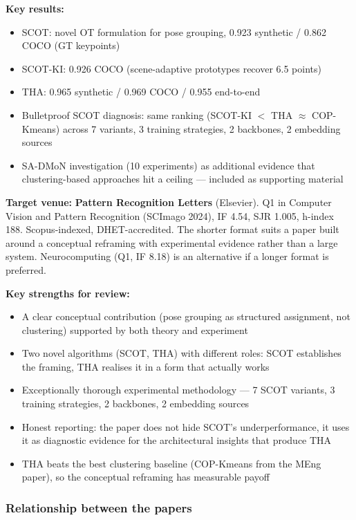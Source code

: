 \textbf{Key results:}
\begin{itemize}
    \item SCOT: novel OT formulation for pose grouping, 0.923 synthetic / 0.862 COCO (GT keypoints)
    \item SCOT-KI: 0.926 COCO (scene-adaptive prototypes recover 6.5 points)
    \item THA: 0.965 synthetic / 0.969 COCO / 0.955 end-to-end
    \item Bulletproof SCOT diagnosis: same ranking (SCOT-KI $<$ THA $\approx$ COP-Kmeans) across 7 variants, 3 training strategies, 2 backbones, 2 embedding sources
    \item SA-DMoN investigation (10 experiments) as additional evidence that clustering-based approaches hit a ceiling --- included as supporting material
\end{itemize}

\textbf{Target venue:} \textbf{Pattern Recognition Letters} (Elsevier). Q1 in Computer Vision and Pattern Recognition (SCImago 2024), IF 4.54, SJR 1.005, h-index 188. Scopus-indexed, DHET-accredited. The shorter format suits a paper built around a conceptual reframing with experimental evidence rather than a large system. Neurocomputing (Q1, IF 8.18) is an alternative if a longer format is preferred.

\textbf{Key strengths for review:}
\begin{itemize}
    \item A clear conceptual contribution (pose grouping as structured assignment, not clustering) supported by both theory and experiment
    \item Two novel algorithms (SCOT, THA) with different roles: SCOT establishes the framing, THA realises it in a form that actually works
    \item Exceptionally thorough experimental methodology --- 7 SCOT variants, 3 training strategies, 2 backbones, 2 embedding sources
    \item Honest reporting: the paper does not hide SCOT's underperformance, it uses it as diagnostic evidence for the architectural insights that produce THA
    \item THA beats the best clustering baseline (COP-Kmeans from the MEng paper), so the conceptual reframing has measurable payoff
\end{itemize}


\subsubsection{Relationship between the papers}

